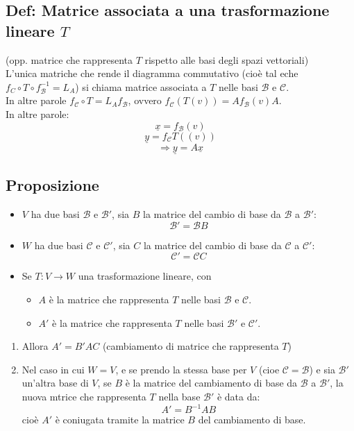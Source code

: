 \begin{itemize}
\subsection{Def: Matrice associata a una trasformazione lineare $T$}
(opp. matrice che rappresenta $T$ rispetto alle basi degli spazi vettoriali)
\\L'unica matriche che rende il diagramma commutativo (cioè tal eche $f_C\circ T\circ f_{\mathcal{B}}^{-1}=L_A$) si chiama matrice associata a $T$ nelle basi $\mathcal{B}$ e $\mathcal{C}$.
\\In altre parole $f_{\mathcal{C}}\circ T= L_Af_{\mathcal{B}}$, ovvero $f_{\mathcal{C}}(T(v))= Af_{\mathcal{B}}(v)A$.
\\In altre parole:
\[\underline{x}=f_{\mathcal{B}}(v)\]
\[\underline{y}=f_{\mathcal{C}}T((v))\]
\[\Rightarrow \underline{y}=A\underline{x}\]

\subsection{Proposizione}
\begin{itemize}
\item $V$ ha due basi $\mathcal{B}$ e $\mathcal{B}'$, sia $B$ la matrice del cambio di base da $\mathcal{B}$ a $\mathcal{B}'$:
  \[\mathcal{B}'=\mathcal{B}B\]

\item $W$ ha due basi $\mathcal{C}$ e $\mathcal{C}'$, sia $C$ la matrice del cambio di base da $\mathcal{C}$ a $\mathcal{C}'$:
  \[\mathcal{C}'=\mathcal{C}C\]

\item Se $T:V\rightarrow W$ una trasformazione lineare, con
  \begin{itemize}
  \item $A$ è la matrice che rappresenta $T$ nelle basi $\mathcal{B}$ e $\mathcal{C}$.
  \item $A'$ è la matrice che rappresenta $T$ nelle basi $\mathcal{B}'$ e $\mathcal{C}'$.
  \end {itemize}
  
\end{itemize}

\begin{enumerate}

\item Allora $A'=B'AC$ (cambiamento di matrice che rappresenta $T$)
\item Nel caso in cui $W=V$, e se prendo la stessa base per $V$ (cioe $\mathcal{C}=\mathcal{B}$) e sia $\mathcal{B}'$ un'altra base di $V$, se $B$ è la matrice del cambiamento di base da $\mathcal{B}$ a $\mathcal{B}'$, la nuova mtrice che rappresenta $T$ nella base $\mathcal{B}'$ è data da:
  \[A'=B^{-1}AB\]
  cioè $A'$ è coniugata tramite la matrice $B$ del cambiamento di base.

\end{enumerate}
\end{itemize}

